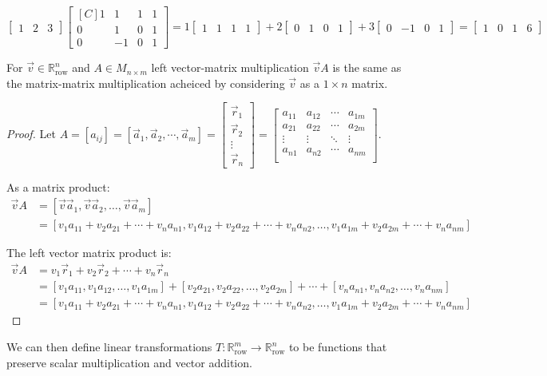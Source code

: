 \begin{example}
$$
\begin{bmatrix}1 & 2 & 3 \end{bmatrix} \begin{bmatrix*}[C] 1 & 1 & 1 & 1 \\ 0 & 1 & 0 & 1 \\ 0 & -1 & 0 & 1 \end{bmatrix*}
=1 \begin{bmatrix}1 & 1 & 1 & 1\end{bmatrix}+2\begin{bmatrix}0 & 1 & 0 & 1\end{bmatrix}+3\begin{bmatrix}0 & -1 & 0 & 1 \end{bmatrix}
=\begin{bmatrix} 1 & 0 & 1 & 6 \end{bmatrix}
$$
%
\end{example}

\begin{proposition}
For $\vec{v} \in \mathbb{R}^n_\text{row}$ and $A \in M_{n \times m}$ left vector-matrix multiplication $\vec{v}A$ is the same as the matrix-matrix multiplication 
acheiced by considering $\vec{v}$ as a $1 \times n$ matrix.
\end{proposition}
\begin{proof}
Let $A=[a_{ij}]=[\vec{a}_1, \vec{a}_2, \cdots, \vec{a}_m]=
\begin{bmatrix}
\vec{r}_1\\
\vec{r}_2\\
\vdots \\ 
\vec{r}_n
\end{bmatrix}=
\begin{bmatrix}
a_{11} & a_{12} & \cdots & a_{1m}\\
a_{21} & a_{22} & \cdots & a_{2m}\\
\vdots & \vdots & \ddots & \vdots\\
a_{n1} & a_{n2} & \cdots & a_{nm}\\
\end{bmatrix}
$.

As a matrix product:
\begin{align*}
\vec{v}A&=[\vec{v}\vec{a}_1, \vec{v}\vec{a}_2, \ldots, \vec{v}\vec{a}_m]\\
&=[v_1a_{11}+v_2a_{21}+\cdots+v_na_{n1}, v_1a_{12}+v_2a_{22}+\cdots+v_na_{n2}, \ldots, v_1a_{1m}+v_2a_{2m}+\cdots+v_na_{nm}]
\end{align*}

The left vector matrix product is:
\begin{align*}
\vec{v}A &=v_1\vec{r}_1+v_2\vec{r}_2+\cdots+v_n\vec{r}_n\\
&=[v_1a_{11}, v_1a_{12}, \ldots, v_1a_{1m}]+[v_2a_{21}, v_2a_{22}, \ldots, v_2a_{2m}]+\cdots+[v_na_{n1}, v_na_{n2}, \ldots, v_na_{nm}]\\
&=[v_1a_{11}+v_2a_{21}+\cdots+v_na_{n1}, v_1a_{12}+v_2a_{22}+\cdots+v_na_{n2}, \ldots, v_1a_{1m}+v_2a_{2m}+\cdots+v_na_{nm}]
\end{align*}
\end{proof}

We can then define linear transformations $T:\mathbb{R}_\text{row}^m \to \mathbb{R}_\text{row}^n$ to be functions that preserve scalar multiplication and 
vector addition. 
